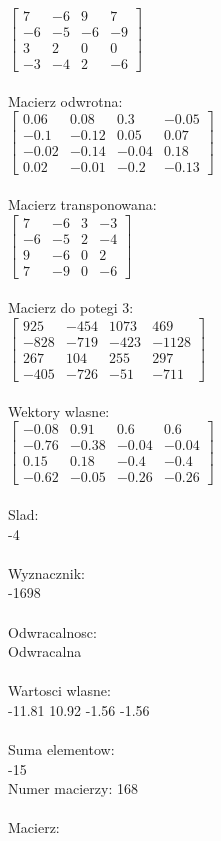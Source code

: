 \documentclass[a4paper,12pt]{article}
\begin{document}
$\begin{bmatrix} 7&-6&9&7\\-6&-5&-6&-9\\3&2&0&0\\-3&-4&2&-6 \end{bmatrix}$
\\
\\
Macierz odwrotna:\\

$\begin{bmatrix} 0.06&0.08&0.3&-0.05\\-0.1&-0.12&0.05&0.07\\-0.02&-0.14&-0.04&0.18\\0.02&-0.01&-0.2&-0.13 \end{bmatrix}$
\\
\\
Macierz transponowana:\\

$\begin{bmatrix} 7&-6&3&-3\\-6&-5&2&-4\\9&-6&0&2\\7&-9&0&-6 \end{bmatrix}$
\\
\\
Macierz do potegi 3:\\

$\begin{bmatrix} 925&-454&1073&469\\-828&-719&-423&-1128\\267&104&255&297\\-405&-726&-51&-711 \end{bmatrix}$
\\
\\
Wektory wlasne:\\

$\begin{bmatrix} -0.08&0.91&0.6&0.6\\-0.76&-0.38&-0.04&-0.04\\0.15&0.18&-0.4&-0.4\\-0.62&-0.05&-0.26&-0.26 \end{bmatrix}$
\\
\\
Slad:\\
-4
\\
\\
Wyznacznik:\\
-1698
\\
\\
Odwracalnosc:\\
Odwracalna
\\
\\
Wartosci wlasne:\\
-11.81 10.92 -1.56 -1.56
\\
\\
Suma elementow:\\
-15
\\
\newpage
Numer macierzy:
168
\\
\\
Macierz:\\
\end{document}
